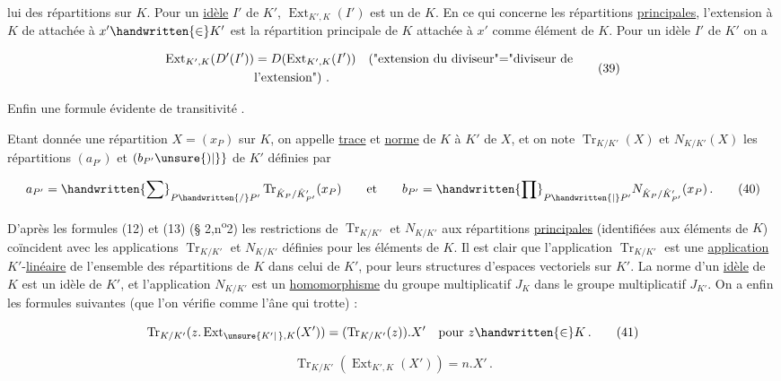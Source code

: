 
lui des répartitions sur $K$. Pour un \uline{idèle} $I'$ de $K'$, $\operatorname{Ext}_{K',K}(I')$ est un  de $K$. En ce qui concerne les répartitions \uline{principales}, l'extension à $K$ de  attachée à $x'\handwritten{\in}K'$ est la répartition principale de $K$ attachée à $x'$  comme élément de $K$. Pour un idèle $I'$ de $K'$ on a

\[ \begin{aligned} \operatorname{Ext}_{K',K}(D'(I'))&=D(\operatorname{Ext}_{K',K}(I'))\quad \text{(\textquotedbl{}extension du diviseur\textquotedbl{}=\textquotedbl{}diviseur de}\\ &\text{l'extension\textquotedbl{}) .}\end{aligned}\tag*{(39)} \]

Enfin une formule évidente de transitivité .

Etant donnée une répartition $X=(x_P)$ sur $K$, on appelle \uline{trace} et \uline{norme} de $K$ à $K'$ de $X$, et on note $\operatorname{Tr}_{K/K'}(X)$ et $N_{K/K'}(X)$ les répartitions $(a_{P'})$ et $(b_{P'}\unsure{)|\}}$ de $K'$ définies par

\[ a_{P'}=\handwritten{\sum}_{P\handwritten{/}P'}\operatorname{Tr}_{\hat K_P/\hat K'_{P'}}(x_P)\qquad \text{et}\qquad b_{P'}=\handwritten{\prod}_{P\handwritten{\mid}P'}N_{\hat K_P/\hat K'_{P'}}(x_P)\,.\tag*{(40)} \]

D'après les formules (12) et (13) (\S{} 2,n\textsuperscript{o}2) les restrictions de $\operatorname{Tr}_{K/K'}$ et $N_{K/K'}$ aux répartitions \uline{principales} (identifiées aux éléments de $K$) coïncident avec les applications $\operatorname{Tr}_{K/K'}$ et $N_{K/K'}$ définies pour les éléments de $K$. Il est clair que l'application $\operatorname{Tr}_{K/K'}$ est une \uline{application} $K'$-\uline{linéaire} de l'ensemble des répartitions de $K$ dans celui de $K'$, pour leurs structures d'espaces vectoriels sur $K'$. La norme d'un \uline{idèle} de $K$ est un idèle de $K'$, et l'application $N_{K/K'}$ est un \uline{homomorphisme} du groupe multiplicatif $J_K$ dans le groupe multiplicatif $J_{K'}$. On a enfin les formules suivantes (que l'on vérifie comme l'âne qui trotte) :

\[ \operatorname{Tr}_{K/K'}(z.\operatorname{Ext}_{\unsure{K'|\,},K}(X'))=(\operatorname{Tr}_{K/K'}(z)).X'\quad \text{pour }z\handwritten{\in}K\,.\tag*{(41)} \]

\[ \operatorname{Tr}_{K/K'}(\operatorname{Ext}_{K',K}(X'))=n.X'\,.\tag*{(42)} \]

